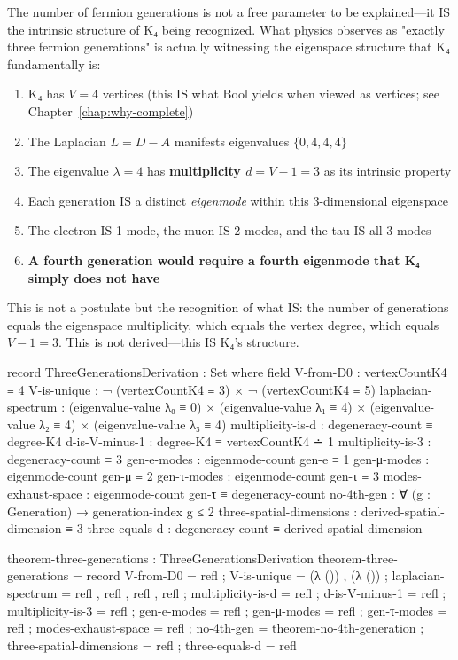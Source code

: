 \documentclass[11pt,a4paper]{book}
\begin{document}
The number of fermion generations is not a free parameter to be explained—it IS the intrinsic structure of K₄ being recognized. What physics observes as "exactly three fermion generations" is actually witnessing the eigenspace structure that K₄ fundamentally is:

\begin{enumerate}
\item K₄ has $V = 4$ vertices (this IS what Bool yields when viewed as vertices; see Chapter~\ref{chap:why-complete})
\item The Laplacian $L = D - A$ manifests eigenvalues $\{0, 4, 4, 4\}$
\item The eigenvalue $\lambda = 4$ has \textbf{multiplicity $d = V - 1 = 3$} as its intrinsic property
\item Each generation IS a distinct \emph{eigenmode} within this 3-dimensional eigenspace
\item The electron IS 1 mode, the muon IS 2 modes, and the tau IS all 3 modes
\item \textbf{A fourth generation would require a fourth eigenmode that K₄ simply does not have}
\end{enumerate}

This is not a postulate but the recognition of what IS: the number of generations equals the eigenspace multiplicity, which equals the vertex degree, which equals $V - 1 = 3$. This is not derived—this IS K₄'s structure.

\begin{code}
record ThreeGenerationsDerivation : Set where
  field
    V-from-D0          : vertexCountK4 ≡ 4
    V-is-unique        : ¬ (vertexCountK4 ≡ 3) × ¬ (vertexCountK4 ≡ 5)
    laplacian-spectrum : (eigenvalue-value λ₀ ≡ 0) × 
                         (eigenvalue-value λ₁ ≡ 4) × 
                         (eigenvalue-value λ₂ ≡ 4) × 
                         (eigenvalue-value λ₃ ≡ 4)
    multiplicity-is-d  : degeneracy-count ≡ degree-K4
    d-is-V-minus-1     : degree-K4 ≡ vertexCountK4 ∸ 1
    multiplicity-is-3  : degeneracy-count ≡ 3
    gen-e-modes : eigenmode-count gen-e ≡ 1
    gen-μ-modes : eigenmode-count gen-μ ≡ 2
    gen-τ-modes : eigenmode-count gen-τ ≡ 3
    modes-exhaust-space : eigenmode-count gen-τ ≡ degeneracy-count
    no-4th-gen : ∀ (g : Generation) → generation-index g ≤ 2
    three-spatial-dimensions : derived-spatial-dimension ≡ 3
    three-equals-d           : degeneracy-count ≡ derived-spatial-dimension

theorem-three-generations : ThreeGenerationsDerivation
theorem-three-generations = record
  { V-from-D0          = refl
  ; V-is-unique        = (λ ()) , (λ ())
  ; laplacian-spectrum = refl , refl , refl , refl
  ; multiplicity-is-d  = refl
  ; d-is-V-minus-1     = refl
  ; multiplicity-is-3  = refl
  ; gen-e-modes        = refl
  ; gen-μ-modes        = refl
  ; gen-τ-modes        = refl
  ; modes-exhaust-space = refl
  ; no-4th-gen         = theorem-no-4th-generation
  ; three-spatial-dimensions = refl
  ; three-equals-d     = refl
  }
\end{code}
\end{document}
